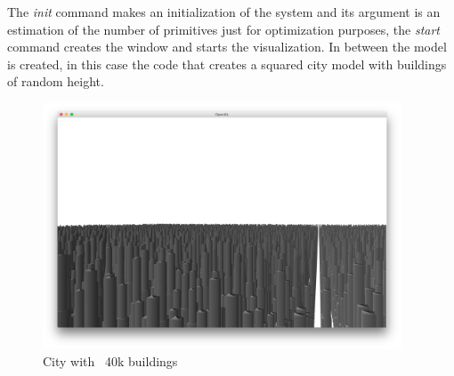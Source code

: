
The \emph{init} command makes an initialization of the system and its argument is an estimation of the number of primitives just for optimization
purposes, the \emph{start} command creates the window and starts the visualization. In between the model is created, in this case the code that creates
a squared city model with buildings of random height.

\colocarFiguraMaisRodada

\begin{figure}[htb]
	\centering
	\includegraphics[width=0.95\textwidth]{img/Solution/City5-racket.png}
	\caption{City with ~40k buildings}
	\label{fig:pic1}
\end{figure}



